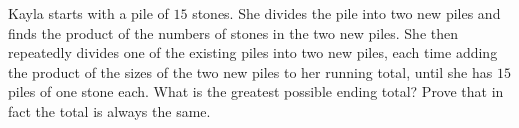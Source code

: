 Kayla starts with a pile of $15$ stones. She divides the pile into two new piles and finds the product of the numbers of stones in the two new piles. She then repeatedly divides one of the existing piles into two new piles, each time adding the product of the sizes of the two new piles to her running total, until she has $15$ piles of one stone each. What is the greatest possible ending total? Prove that in fact the total is always the same.
